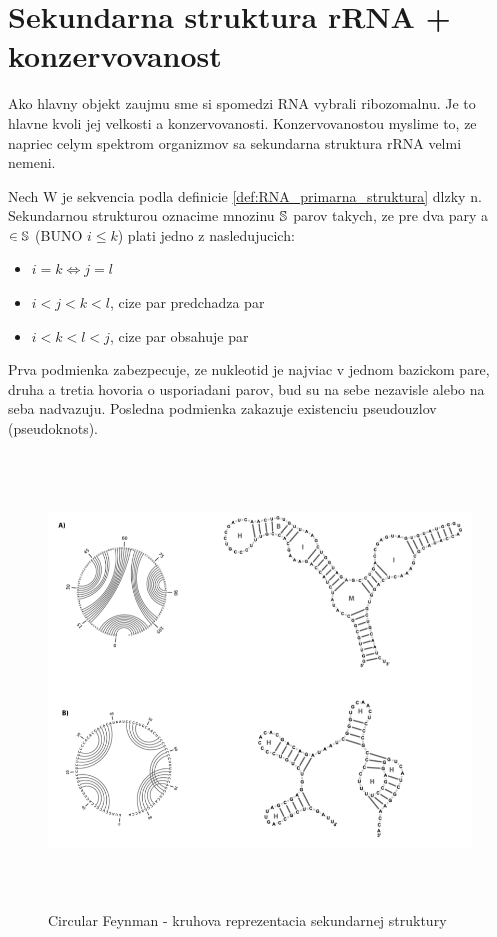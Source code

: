 
\section{Sekundarna struktura rRNA + konzervovanost}

Ako hlavny objekt zaujmu sme si spomedzi RNA vybrali ribozomalnu.
Je to hlavne kvoli jej velkosti a konzervovanosti.
Konzervovanostou myslime to, ze napriec celym spektrom organizmov sa sekundarna struktura
rRNA velmi nemeni. 

\begin{definice}\label{def:RNA_sekundarna_struktura}
	Nech W je sekvencia podla definicie \ref{def:RNA_primarna_struktura} dlzky n.
	Sekundarnou strukturou oznacime mnozinu $\mathbb{S}$ parov  takych, ze
	pre dva pary  a  $\in \mathbb{S}$ (BUNO $i \leq k$) plati jedno z nasledujucich:
	\begin{itemize}
		\item $i = k \iff j = l$
		\item $i < j < k < l$, cize par  predchadza par 
		\item $i < k < l < j$, cize par  obsahuje par 
	\end{itemize}
\end{definice}

Prva podmienka zabezpecuje, ze nukleotid je najviac v jednom bazickom pare, druha a tretia
hovoria o usporiadani parov, bud su na sebe nezavisle alebo na seba nadvazuju.
Posledna podmienka zakazuje existenciu pseudouzlov (pseudoknots).


\begin{figure}[H]
\centering
\includegraphics[width=140mm, height=120mm]{../img/RNA_circular_reprezentation.png}
\caption{Circular Feynman - kruhova reprezentacia sekundarnej struktury}
\label{obr:RNA_motifs}
\end{figure}


